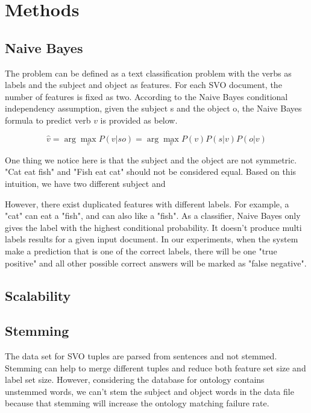 \section{Methods}

\subsection{Naive Bayes}

The problem can be defined as a text classification problem with the verbs as labels and the subject and object as features. For each SVO document, the number of features is fixed as two. According to the Naive Bayes conditional independency assumption, given the subject s and the object o, the Naive Bayes formula to predict verb $v$ is provided as below.

\begin{equation}
	\hat{v} = \arg\max_v P(v|so) = \arg\max_v P(v)P(s|v)P(o|v)
\end{equation}

One thing we notice here is that the subject and the object are not symmetric. "Cat eat fish" and "Fish eat cat" should not be considered equal. Based on this intuition, we have two different subject and 

However, there exist duplicated features with different labels. For example, a "cat" can eat a "fish", and can also like a "fish". As a classifier, Naive Bayes only gives the label with the highest conditional probability. It doesn't produce multi labels results for a given input document. In our experiments, when the system make a prediction that is one of the correct labels, there will be one "true positive" and all other possible correct answers will be marked as "false negative".

\subsection{Scalability}


\subsection{Stemming}

The data set for SVO tuples are parsed from sentences and not stemmed. Stemming can help to merge different tuples and reduce both feature set size and label set size. However, considering the database for ontology contains unstemmed words, we can't stem the subject and object words in the data file because that stemming will increase the ontology matching failure rate.

